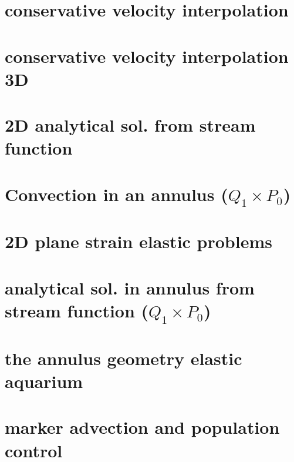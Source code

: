 \documentclass[a4paper,11pt]{report}
\begin{document}
\chapter{conservative velocity interpolation \label{f30}} %

\chapter{conservative velocity interpolation 3D \label{f31}} %

\chapter{2D analytical sol. from stream function \label{f32}} %

\chapter{Convection in an annulus  ($Q_1\times P_0$)  \label{f33}}

\chapter{2D plane strain elastic problems\label{f34}} 

\chapter{analytical sol. in annulus from stream function ($Q_1\times P_0$) \label{f35}}

\chapter{the annulus geometry elastic aquarium \label{f36}}%

\chapter{marker advection and population control \label{f37}}
\end{document}
